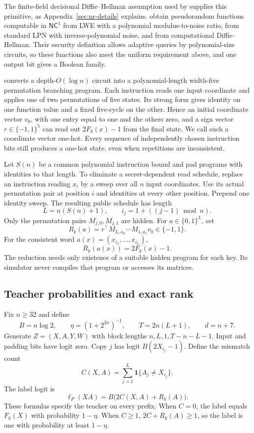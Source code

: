 \documentclass[11pt]{article}
\newcommand{\NC}{\mathsf{NC}^{1}}
\theoremstyle{definition}
\theoremstyle{remark}
\begin{document}
The finite-field decisional Diffie--Hellman assumption used by \citet{nr} supplies this primitive, as Appendix~\ref{sec:nr-details} explains. \citet{djk} obtain pseudorandom functions computable in $\NC$ from LWE with a polynomial modulus-to-noise ratio, from standard LPN with inverse-polynomial noise, and from computational Diffie--Hellman. Their security definition allows adaptive queries by polynomial-size circuits, so these functions also meet the uniform requirement above, and one output bit gives a Boolean family.

\citet{barrington} converts a depth-$O(\log n)$ circuit into a polynomial-length width-five permutation branching program. Each instruction reads one input coordinate and applies one of two permutations of five states. Its strong form gives identity on one function value and a fixed five-cycle on the other. Hence an initial coordinate vector $v_0$, with one entry equal to one and the others zero, and a sign vector $r\in\{-1,1\}^5$ can read out $2F_k(x)-1$ from the final state. We call such a coordinate vector one-hot. Every sequence of independently chosen instruction bits still produces a one-hot state, even when repetitions are inconsistent.

Let $S(n)$ be a common polynomial instruction bound and pad programs with identities to that length. To eliminate a secret-dependent read schedule, replace an instruction reading $x_i$ by a sweep over all $n$ input coordinates. Use its actual permutation pair at position $i$ and identities at every other position. Prepend one identity sweep. The resulting public schedule has length
\[
L=n(S(n)+1),\qquad i_j=1+((j-1)\bmod n).
\]
Only the permutation pairs $M_{j,0},M_{j,1}$ are hidden. For $a\in\{0,1\}^L$, set
\[
R_k(a)=r^\top M_{L,a_L}\cdots M_{1,a_1}v_0\in\{-1,1\}.
\]
For the consistent word $a(x)=(x_{i_1},\ldots,x_{i_L})$,
\begin{equation}\label{eq:hard-consistency}
R_k(a(x))=2F_k(x)-1.
\end{equation}
The reduction needs only existence of a suitable hidden program for each key. Its simulator never compiles that program or accesses its matrices.

\subsection{Teacher probabilities and exact rank}

Fix $n\ge32$ and define
\begin{equation}\label{eq:hard-parameters}
B=n\log2,\qquad \eta=(1+2^{2n})^{-1},\qquad
T=2n(L+1),\qquad d=n+7.
\end{equation}
Generate $Z=(X,A,Y,W)$ with block lengths $n,L,1,T-n-L-1$. Input and padding bits have logit zero. Copy $j$ has logit $B(2X_{i_j}-1)$. Define the mismatch count
\[
C(X,A)=\sum_{j=1}^L\mathbf1\{A_j\ne X_{i_j}\}.
\]
The label logit is
\begin{equation}\label{eq:hard-mask}
\boxed{\ell_P(XA)=B\bigl(2C(X,A)+R_k(A)\bigr)}.
\end{equation}
These formulas specify the teacher on every prefix. When $C=0$, the label equals $F_k(X)$ with probability $1-\eta$. When $C\ge1$, $2C+R_k(A)\ge1$, so the label is one with probability at least $1-\eta$.
\end{document}
